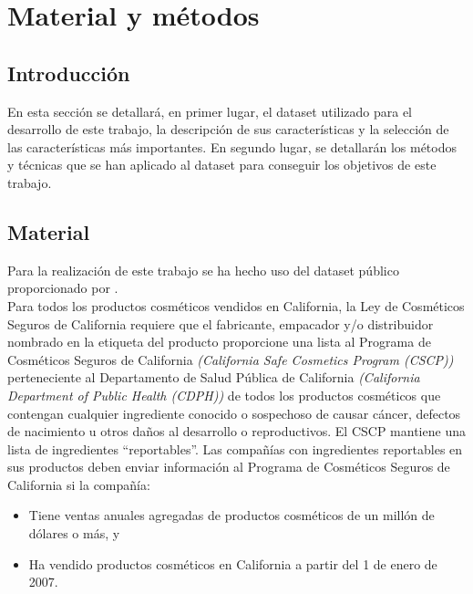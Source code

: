 
\chapter{Material y métodos} %
\label{chap:material-methods} %


\section{Introducción}

En esta sección se detallará, en primer lugar, el dataset utilizado para el desarrollo de este trabajo, la descripción de sus características y la selección de las características más importantes. En segundo lugar, se detallarán los métodos y técnicas que se han aplicado al dataset para conseguir los objetivos de este trabajo.





\section{Material}
\label{sec:material}

Para la realización de este trabajo se ha hecho uso del dataset público  \citep{dataset} proporcionado por  \citep{healthdata}. \\

Para todos los productos cosméticos vendidos en California, la Ley de Cosméticos Seguros de California requiere que el fabricante, empacador y/o distribuidor nombrado en la etiqueta del producto proporcione una lista al Programa de Cosméticos Seguros de California \textit{(California Safe Cosmetics Program (CSCP))} perteneciente al Departamento de Salud Pública de California \textit{(California Department of Public Health (CDPH))} de todos los productos cosméticos que contengan cualquier ingrediente conocido o sospechoso de causar cáncer, defectos de nacimiento u otros daños al desarrollo o reproductivos. El CSCP mantiene una lista de ingredientes ``reportables''. Las compañías con ingredientes reportables en sus productos deben enviar información al Programa de Cosméticos Seguros de California si la compañía:

\begin{itemize}
 \item Tiene ventas anuales agregadas de productos cosméticos de un millón de dólares o más, y
 \item Ha vendido productos cosméticos en California a partir del 1 de enero de 2007.
\end{itemize}

